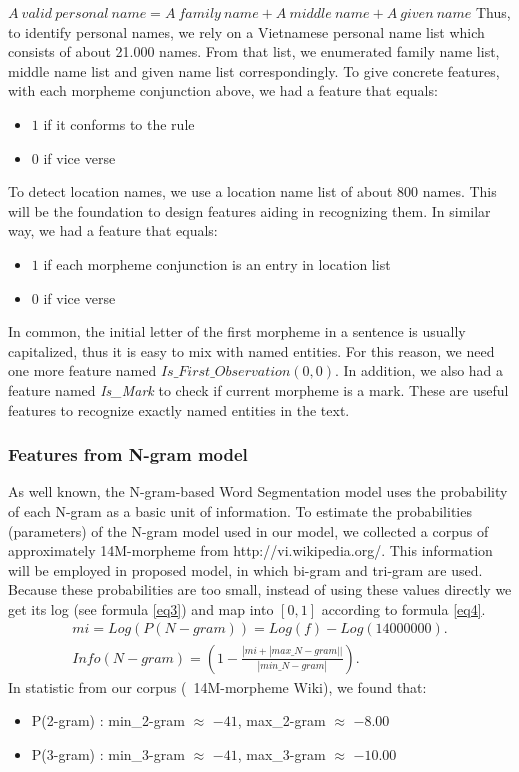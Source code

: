\documentclass[english]{jnlp_1.4}
\begin{document}
$\mathit{A\ valid\ personal\ name} = \mathit{A\ family\ name} + \mathit{A\ middle\ name} + \mathit{A\ given\ name}$
Thus, to identify personal names, we rely on a Vietnamese personal name list which consists of
about 21.000 names.
From that list, we enumerated family name list, middle name list and given name list correspondingly.
To give concrete features, with each morpheme conjunction above, we had a feature that equals:
\begin{itemize}
  \item $1$ if it conforms to the rule
  \item $0$ if vice verse
\end{itemize}
To detect location names, we use a location name list of about 800 names.
This will be the foundation to design features aiding in recognizing them.
In similar way, we had a feature that equals:
\begin{itemize}
  \item $1$ if each morpheme conjunction is an entry in location list
  \item $0$ if vice verse
\end{itemize}
    In common, the initial letter of the first morpheme in a sentence is
usually  capitalized, thus it is easy to mix with named entities. For this reason, we
need one more feature named $\mathit{Is\_First\_Observation}(0,0)$. In addition, we also had a
feature named \emph{Is\_Mark} to check if current morpheme is a mark.
These are useful features to recognize exactly named entities in the text.


\subsubsection{Features from N-gram model}

As well known, the N-gram-based Word Segmentation model uses the
probability of each N-gram as a basic unit of information. To
estimate the probabilities (parameters) of the N-gram model
used in our model, we collected a corpus of approximately 14M-morpheme from
http://vi.wikipedia.org/. This information will be employed in proposed
model, in which bi-gram and tri-gram are used. Because
these probabilities are too small, instead of using these values directly we get
its log (see formula \ref{eq3}) and map into $[0,1]$ according to formula \ref{eq4}.
\begin{gather}
         mi = Log (P(N-gram)) = Log (f) - Log(14000000)  .
\label{eq3} \\[0.5ex]
         Info(N-gram) =  \left(1 - \frac{|mi + |max\_N-gram||}{|min\_N-gram|}\right)  .
\label{eq4}
\end{gather}
In statistic from our corpus (~14M-morpheme Wiki), we found that:
\begin{itemize}
  \item P(2-gram) : min\_2-gram $\approx$ $-41$, max\_2-gram $\approx$ $-8.00$
  \item P(3-gram) : min\_3-gram $\approx$ $-41$, max\_3-gram $\approx$ $-10.00$
\end{itemize}
\end{document}
